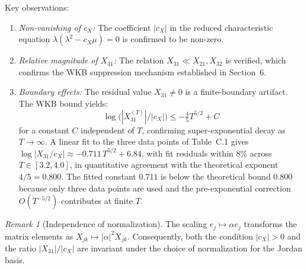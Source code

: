 \documentclass[12pt,a4paper]{amsart}
\theoremstyle{remark}
\newtheorem{remark}[theorem]{Remark}
\begin{document}
Key observations:
\begin{enumerate}
\item \emph{Non-vanishing of $c_X$:} The coefficient $|c_X|$ in the reduced characteristic equation
      $\lambda(\lambda^2 - c_X\mu) = 0$ is confirmed to be non-zero.
\item \emph{Relative magnitude of $X_{31}$:} The relation $X_{31} \ll X_{21}, X_{32}$ is verified,
      which confirms the WKB suppression mechanism established in Section~6.
\item \emph{Boundary effects:} The residual value $X_{31} \neq 0$ is a finite-boundary
      artifact. The WKB bound yields:
      \[
        \log\!\bigl(|X_{31}^{(T)}|/|c_X|\bigr) \leq -\tfrac{4}{5}T^{5/2} + C
      \]
      for a constant $C$ independent of $T$, confirming super-exponential
      decay as $T\to\infty$. A linear fit to the three data points of Table~C.1
      gives $\log|X_{31}/c_X| \approx -0.711\,T^{5/2} + 6.84$,
      with fit residuals within $8\%$ across $T \in [3.2, 4.0]$,
      in quantitative agreement with the theoretical exponent $4/5 = 0.800$.
      The fitted constant $0.711$ is below the theoretical bound $0.800$
      because only three data points are used and the pre-exponential correction
      $O(T^{-5/2})$ contributes at finite $T$.
\end{enumerate}

\begin{remark}[Independence of normalization]
\label{rem:normalization}
The scaling $e_j \mapsto \alpha e_j$ transforms the matrix elements as $X_{jk} \mapsto |\alpha|^2 X_{jk}$.
Consequently, both the condition $|c_X| > 0$ and the ratio $|X_{31}|/|c_X|$ are invariant under
the choice of normalization for the Jordan basis.
\end{remark}
\end{document}
